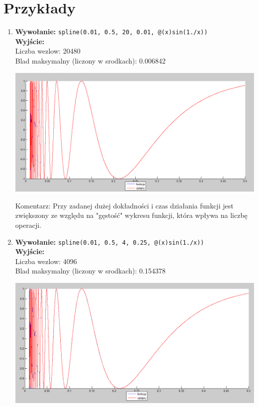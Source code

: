 \documentclass[]{article}
\begin{document}
\section{Przykłady}
\begin{enumerate}

\item \textbf{Wywołanie:} \verb|spline(0.01, 0.5, 20, 0.01, @(x)sin(1./x))|
\\\textbf{Wyjście:}
\\Liczba wezlow: 20480
\\Blad maksymalny (liczony w srodkach): 0.006842
\begin{center}
	\includegraphics[scale = 0.4]{1.png}
\end{center}
Komentarz: Przy zadanej dużej dokładności i  czas działania funkcji jest zwiększony ze względu na "gęstość" wykresu funkcji, która wpływa na liczbę operacji.
\newpage
\item \textbf{Wywołanie:} \verb|spline(0.01, 0.5, 4, 0.25, @(x)sin(1./x))|
\\\textbf{Wyjście:}
\\Liczba wezlow: 4096
\\Blad maksymalny (liczony w srodkach): 0.154378
\begin{center}
	\includegraphics[scale = 0.4]{2.png}
\end{center}


\end{enumerate}
\end{document}
